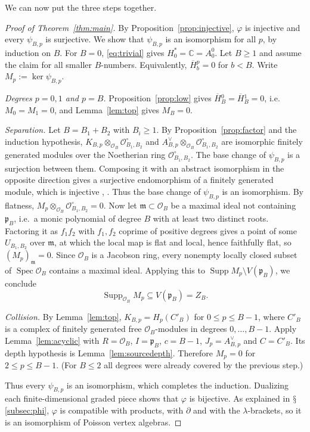 \documentclass[11pt]{amsart}
\numberwithin{equation}{section}
\renewcommand{\S}{\mbox{$\mathsection$}}
\theoremstyle{definition}
\theoremstyle{remark}
\newcommand{\C}{\mathbb{C}}
\newcommand{\pp}{\mathfrak{p}}
\newcommand{\dd}{\partial}
\newcommand{\cO}{\mathcal{O}}
\newcommand{\Spec}{\operatorname{Spec}}
\newcommand{\Supp}{\operatorname{Supp}}
\newcommand{\Hb}{\overline{H}}
\begin{document}
We can now put the three steps together.

\begin{proof}[Proof of Theorem~\ref{thm:main}]
By Proposition~\ref{prop:injective}, $\varphi$ is injective and every $\psi_{B,p}$ is surjective. We show that $\psi_{B,p}$ is an isomorphism for all $p$, by induction on $B$. For $B=0$, \eqref{eq:trivial} gives $H_0^*=\C=A_0^0$. Let $B\ge1$ and assume the claim for all smaller $B$-numbers. Equivalently, $\Hb{}_b^p=0$ for $b<B$. Write $M_p:=\ker\psi_{B,p}$.

\emph{Degrees $p=0,1$ and $p=B$.} Proposition~\ref{prop:low} gives $\Hb{}_B^0=\Hb{}_B^1=0$, i.e.\ $M_0=M_1=0$, and Lemma~\ref{lem:top} gives $M_B=0$.

\emph{Separation.} Let $B=B_1+B_2$ with $B_i\ge1$. By Proposition~\ref{prop:factor} and the induction hypothesis, $K_{B,p}\otimes_{\cO_B}\cO^\circ_{B_1,B_2}$ and $A^\vee_{B,p}\otimes_{\cO_B}\cO^\circ_{B_1,B_2}$ are isomorphic finitely generated modules over the Noetherian ring $\cO^\circ_{B_1,B_2}$. The base change of $\psi_{B,p}$ is a surjection between them. Composing it with an abstract isomorphism in the opposite direction gives a surjective endomorphism of a finitely generated module, which is injective \cite[Theorem~2.4]{Mat86}, \cite[Tag~05G8]{Stacks}. Thus the base change of $\psi_{B,p}$ is an isomorphism. By flatness, $M_p\otimes_{\cO_B}\cO^\circ_{B_1,B_2}=0$. Now let $\mathfrak m\subset\cO_B$ be a maximal ideal not containing $\pp_B$, i.e.\ a monic polynomial of degree $B$ with at least two distinct roots. Factoring it as $f_1f_2$ with $f_1,f_2$ coprime of positive degrees gives a point of some $U_{B_1,B_2}$ over $\mathfrak m$, at which the local map is flat and local, hence faithfully flat, so $(M_p)_{\mathfrak m}=0$. Since $\cO_B$ is a Jacobson ring, every nonempty locally closed subset of $\Spec\cO_B$ contains a maximal ideal. Applying this to $\Supp M_p\setminus V(\pp_B)$, we conclude
\begin{equation}\label{eq:support}
\Supp_{\cO_B}M_p\subseteq V(\pp_B)=Z_B .
\end{equation}

\emph{Collision.} By Lemma~\ref{lem:top}, $K_{B,p}=H_p(C'_B)$ for $0\le p\le B-1$, where $C'_B$ is a complex of finitely generated free $\cO_B$-modules in degrees $0,\dots,B-1$. Apply Lemma~\ref{lem:acyclic} with $R=\cO_B$, $I=\pp_B$, $c=B-1$, $J_p=A^\vee_{B,p}$ and $C=C'_B$. Its depth hypothesis is Lemma~\ref{lem:sourcedepth}. Therefore $M_p=0$ for $2\le p\le B-1$. (For $B\le2$ all degrees were already covered by the previous step.)

Thus every $\psi_{B,p}$ is an isomorphism, which completes the induction. Dualizing each finite-dimensional graded piece shows that $\varphi$ is bijective. As explained in \S\ref{subsec:phi}, $\varphi$ is compatible with products, with $\dd$ and with the $\lambda$-brackets, so it is an isomorphism of Poisson vertex algebras.
\end{proof}
\end{document}
